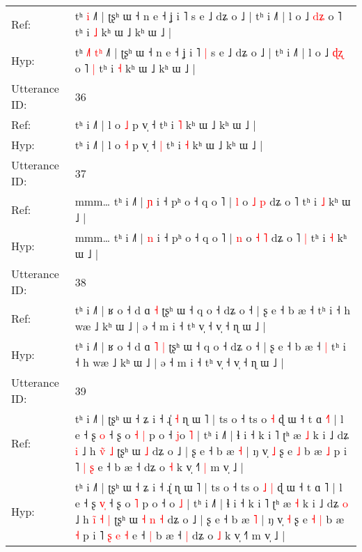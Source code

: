\documentclass[10pt]{article}
\DeclareRobustCommand{\hl}[1]{{\textcolor{red}{#1}}}
\begin{document}
\begin{longtable}{ll}
Ref: & tʰ\hl{}\hl{}\hl{} \hl{}\hl{i} ˩˥ | ʈʂʰ ɯ ˧ n e ˧ ʝ i ˥\hl{}\hl{} s e ˩ dʑ o ˩ | tʰ i ˩˥ | l o ˩ \hl{d}\hl{ʑ} o ˥\hl{}\hl{} tʰ i \hl{˩} kʰ ɯ ˩ kʰ ɯ ˩ |
 \\
Hyp: & tʰ\hl{ }\hl{˩}\hl{˥} \hl{t}\hl{ʰ} ˩˥ | ʈʂʰ ɯ ˧ n e ˧ ʝ i ˥\hl{ }\hl{|} s e ˩ dʑ o ˩ | tʰ i ˩˥ | l o ˩ \hl{ɖ}\hl{ʐ} o ˥\hl{ }\hl{|} tʰ i \hl{˧} kʰ ɯ ˩ kʰ ɯ ˩ |
 \\
\midrule
Utterance ID: & 36 \\
Ref: & tʰ i ˩˥ | l o \hl{˩} p v̩ ˧\hl{}\hl{} tʰ i \hl{˥} kʰ ɯ ˩ kʰ ɯ ˩ |
 \\
Hyp: & tʰ i ˩˥ | l o \hl{˧} p v̩ ˧\hl{ }\hl{|} tʰ i \hl{˧} kʰ ɯ ˩ kʰ ɯ ˩ |
 \\
\midrule
Utterance ID: & 37 \\
Ref: & mmm… tʰ i ˩˥ | \hl{ɲ} i ˧ pʰ o ˧ q o ˥ | \hl{l} o \hl{˩} \hl{p} dʑ o ˥\hl{}\hl{} tʰ i \hl{˩} kʰ ɯ ˩ |
 \\
Hyp: & mmm… tʰ i ˩˥ | \hl{n} i ˧ pʰ o ˧ q o ˥ | \hl{n} o \hl{˧} \hl{˥} dʑ o ˥\hl{ }\hl{|} tʰ i \hl{˧} kʰ ɯ ˩ |
 \\
\midrule
Utterance ID: & 38 \\
Ref: & tʰ i ˩˥ | ʁ o ˧ d ɑ\hl{}\hl{} \hl{˧} ʈʂʰ ɯ ˧ q o ˧ dʑ o ˧ | ʂ e ˧ b æ ˧\hl{}\hl{} tʰ i ˧ h wæ ˩ kʰ ɯ ˩ | ə ˧ m i ˧ tʰ v̩ ˧ v̩ ˧ ɳ ɯ ˩ |
 \\
Hyp: & tʰ i ˩˥ | ʁ o ˧ d ɑ\hl{ }\hl{˥} \hl{|} ʈʂʰ ɯ ˧ q o ˧ dʑ o ˧ | ʂ e ˧ b æ ˧\hl{ }\hl{|} tʰ i ˧ h wæ ˩ kʰ ɯ ˩ | ə ˧ m i ˧ tʰ v̩ ˧ v̩ ˧ ɳ ɯ ˩ |
 \\
\midrule
Utterance ID: & 39 \\
Ref: & tʰ i ˩˥ | ʈʂʰ ɯ ˧ ʑ i ˧ ɻ̍\hl{ }\hl{˧} ɳ ɯ ˥ | ts o ˧ ts o\hl{}\hl{} \hl{˧} ɖ ɯ ˧ t ɑ \hl{˧}˥ | l e ˧ ʂ \hl{}\hl{o} ˧ ʂ o\hl{ }\hl{˧} \hl{|} p o ˧ \hl{j}o \hl{˥} | tʰ i ˩˥ | ɬ i ˧ k i ˥ ʈʰ æ \hl{˩} k i ˩ dʑ \hl{i} ˩ h \hl{v}̃\hl{}\hl{} \hl{˩} ʈʂʰ ɯ\hl{}\hl{}\hl{}\hl{} \hl{˩} dʑ o ˩ | ʂ e ˧ b æ \hl{˧} | ŋ v̩ \hl{˩} ʂ e\hl{}\hl{} \hl{˩} b æ \hl{˩} p i ˥\hl{}\hl{} \hl{|} \hl{ʂ} e ˧\hl{}\hl{} b æ ˧\hl{}\hl{} dʑ o \hl{˧} k v̩ ˧˥\hl{ }\hl{|} m v̩ ˩ |
 \\
Hyp: & tʰ i ˩˥ | ʈʂʰ ɯ ˧ ʑ i ˧ ɻ̍\hl{}\hl{} ɳ ɯ ˥ | ts o ˧ ts o\hl{ }\hl{˩} \hl{|} ɖ ɯ ˧ t ɑ \hl{}˥ | l e ˧ ʂ \hl{v}\hl{̩} ˧ ʂ o\hl{}\hl{} \hl{˥} p o ˧ \hl{}o \hl{˩} | tʰ i ˩˥ | ɬ i ˧ k i ˥ ʈʰ æ \hl{˧} k i ˩ dʑ \hl{o} ˩ h \hl{i}̃\hl{ }\hl{˧} \hl{|} ʈʂʰ ɯ\hl{ }\hl{˧}\hl{ }\hl{n} \hl{˧} dʑ o ˩ | ʂ e ˧ b æ \hl{˥} | ŋ v̩ \hl{˧} ʂ e\hl{ }\hl{˧} \hl{|} b æ \hl{˧} p i ˥\hl{ }\hl{ʂ} \hl{e} \hl{˧} e ˧\hl{ }\hl{|} b æ ˧\hl{ }\hl{|} dʑ o \hl{˩} k v̩ ˧˥\hl{}\hl{} m v̩ ˩ |
 \\

\end{longtable}
\end{document}
